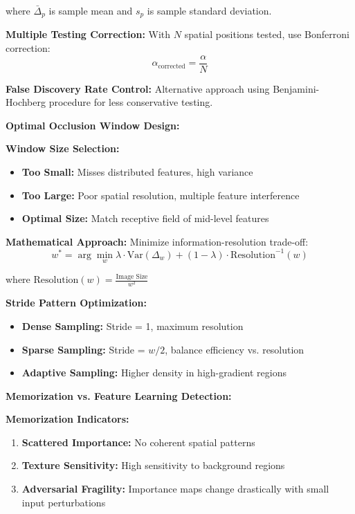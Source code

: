 \documentclass[12pt]{article}
\begin{document}
\begin{enumerate}[(a)]
{    where $\bar{\Delta}_p$ is sample mean and $s_p$ is sample standard deviation.
    
    \textbf{Multiple Testing Correction:}
    With $N$ spatial positions tested, use Bonferroni correction:
    $$\alpha_{\text{corrected}} = \frac{\alpha}{N}$$
    
    \textbf{False Discovery Rate Control:}
    Alternative approach using Benjamini-Hochberg procedure for less conservative testing.
    
    \textbf{Optimal Occlusion Window Design:}
    
    \textbf{Window Size Selection:}
    \begin{itemize}
        \item \textbf{Too Small:} Misses distributed features, high variance
        \item \textbf{Too Large:} Poor spatial resolution, multiple feature interference
        \item \textbf{Optimal Size:} Match receptive field of mid-level features
    \end{itemize}
    
    \textbf{Mathematical Approach:}
    Minimize information-resolution trade-off:
    $$w^* = \arg\min_w \lambda \cdot \text{Var}(\Delta_w) + (1-\lambda) \cdot \text{Resolution}^{-1}(w)$$
    
    where $\text{Resolution}(w) = \frac{\text{Image Size}}{w^2}$
    
    \textbf{Stride Pattern Optimization:}
    \begin{itemize}
        \item \textbf{Dense Sampling:} Stride = 1, maximum resolution
        \item \textbf{Sparse Sampling:} Stride = $w/2$, balance efficiency vs. resolution
        \item \textbf{Adaptive Sampling:} Higher density in high-gradient regions
    \end{itemize}
    
    \textbf{Memorization vs. Feature Learning Detection:}
    
    \textbf{Memorization Indicators:}
    \begin{enumerate}
        \item \textbf{Scattered Importance:} No coherent spatial patterns
        \item \textbf{Texture Sensitivity:} High sensitivity to background regions
        \item \textbf{Adversarial Fragility:} Importance maps change drastically with small input perturbations
    \end{enumerate}
    
}
\end{enumerate}
\end{document}
